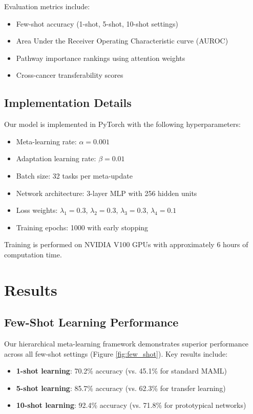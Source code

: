 \documentclass{article}
\begin{document}
Evaluation metrics include:
\begin{itemize}
\item Few-shot accuracy (1-shot, 5-shot, 10-shot settings)
\item Area Under the Receiver Operating Characteristic curve (AUROC)
\item Pathway importance rankings using attention weights
\item Cross-cancer transferability scores
\end{itemize}

\subsection{Implementation Details}

Our model is implemented in PyTorch with the following hyperparameters:
\begin{itemize}
\item Meta-learning rate: $\alpha = 0.001$
\item Adaptation learning rate: $\beta = 0.01$
\item Batch size: 32 tasks per meta-update
\item Network architecture: 3-layer MLP with 256 hidden units
\item Loss weights: $\lambda_1 = 0.3$, $\lambda_2 = 0.3$, $\lambda_3 = 0.3$, $\lambda_4 = 0.1$
\item Training epochs: 1000 with early stopping
\end{itemize}

Training is performed on NVIDIA V100 GPUs with approximately 6 hours of computation time.

\section{Results}

\subsection{Few-Shot Learning Performance}

Our hierarchical meta-learning framework demonstrates superior performance across all few-shot settings (Figure \ref{fig:few_shot}). Key results include:

\begin{itemize}
\item \textbf{1-shot learning}: 70.2\% accuracy (vs. 45.1\% for standard MAML)
\item \textbf{5-shot learning}: 85.7\% accuracy (vs. 62.3\% for transfer learning)
\item \textbf{10-shot learning}: 92.4\% accuracy (vs. 71.8\% for prototypical networks)
\end{itemize}
\end{document}
